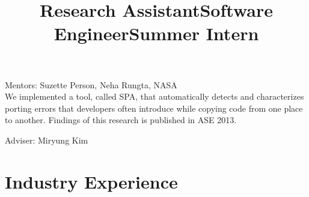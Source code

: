 \documentclass[overlapped,line,letterpaper, 12pt]{res}
\begin{document}
\begin{resume}

\begin{position}
Mentors: Suzette Person, Neha Rungta, NASA \\
We implemented a tool, called SPA, that automatically detects and characterizes porting errors that developers often 
introduce while copying code from one place to another. Findings of this research is published in ASE 2013.
\end{position} 

\title{{Research Assistant}}
\begin{position}
Adviser: Miryung Kim\\
\end{position}

\vspace{-1cm}




\section{\bf Industry Experience}






\title{{Software Engineer}}
\begin{position}
\end{position}

\vspace{-1cm}

\title{{Summer Intern}} %
\begin{position}
\end{position}


\end{resume}
\end{document}
